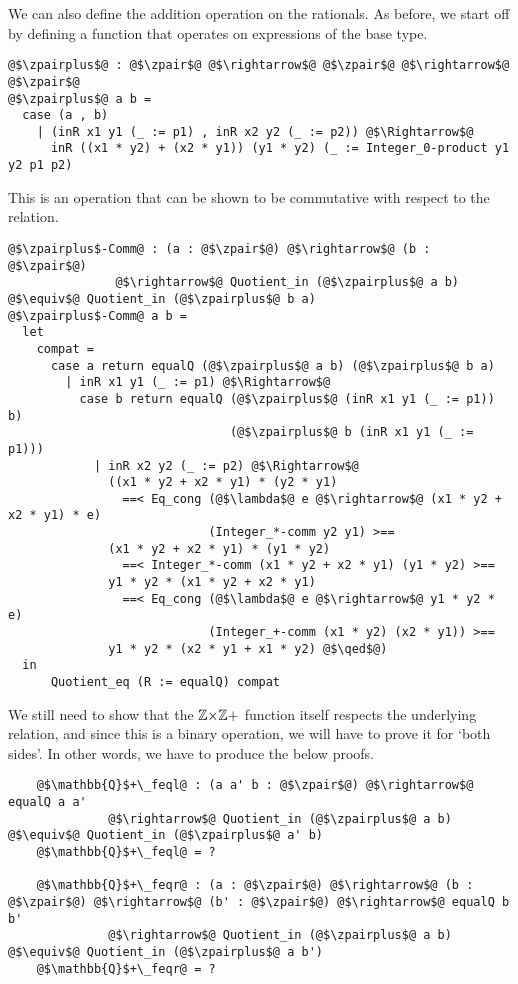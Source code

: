 \documentclass[12pt,twoside,maitrise]{dms}
\theoremstyle{definition}
\numberwithin{equation}{section}
\numberwithin{table}{chapter}
\numberwithin{figure}{chapter}
\renewcommand\qed{\blacksquare}
\begin{document}
We can also define the addition operation on the rationals. As before, we start
off by defining a function that operates on expressions of the base type.

\begin{verbatim}
@$\zpairplus$@ : @$\zpair$@ @$\rightarrow$@ @$\zpair$@ @$\rightarrow$@ @$\zpair$@
@$\zpairplus$@ a b =
  case (a , b)
    | (inR x1 y1 (_ := p1) , inR x2 y2 (_ := p2)) @$\Rightarrow$@
      inR ((x1 * y2) + (x2 * y1)) (y1 * y2) (_ := Integer_0-product y1 y2 p1 p2)
\end{verbatim}

This is an operation that can be shown to be commutative with respect to the
relation.

\begin{verbatim}
@$\zpairplus$-Comm@ : (a : @$\zpair$@) @$\rightarrow$@ (b : @$\zpair$@)
               @$\rightarrow$@ Quotient_in (@$\zpairplus$@ a b) @$\equiv$@ Quotient_in (@$\zpairplus$@ b a)
@$\zpairplus$-Comm@ a b =
  let
    compat =
      case a return equalQ (@$\zpairplus$@ a b) (@$\zpairplus$@ b a)
        | inR x1 y1 (_ := p1) @$\Rightarrow$@
          case b return equalQ (@$\zpairplus$@ (inR x1 y1 (_ := p1)) b)
                               (@$\zpairplus$@ b (inR x1 y1 (_ := p1)))
            | inR x2 y2 (_ := p2) @$\Rightarrow$@
              ((x1 * y2 + x2 * y1) * (y2 * y1)
                ==< Eq_cong (@$\lambda$@ e @$\rightarrow$@ (x1 * y2 + x2 * y1) * e)
                            (Integer_*-comm y2 y1) >==
              (x1 * y2 + x2 * y1) * (y1 * y2)
                ==< Integer_*-comm (x1 * y2 + x2 * y1) (y1 * y2) >==
              y1 * y2 * (x1 * y2 + x2 * y1)
                ==< Eq_cong (@$\lambda$@ e @$\rightarrow$@ y1 * y2 * e)
                            (Integer_+-comm (x1 * y2) (x2 * y1)) >==
              y1 * y2 * (x2 * y1 + x1 * y2) @$\qed$@)
  in
      Quotient_eq (R := equalQ) compat
\end{verbatim}

We still need to show that the $\mathbb{Z}{\times}\mathbb{Z}+$ function itself respects the
underlying relation, and since this is a binary operation, we will have to prove
it for `both sides'. In other words, we have to produce the below proofs.

\begin{verbatim}
    @$\mathbb{Q}$+\_feql@ : (a a' b : @$\zpair$@) @$\rightarrow$@ equalQ a a'
              @$\rightarrow$@ Quotient_in (@$\zpairplus$@ a b) @$\equiv$@ Quotient_in (@$\zpairplus$@ a' b)
    @$\mathbb{Q}$+\_feql@ = ?

    @$\mathbb{Q}$+\_feqr@ : (a : @$\zpair$@) @$\rightarrow$@ (b : @$\zpair$@) @$\rightarrow$@ (b' : @$\zpair$@) @$\rightarrow$@ equalQ b b'
              @$\rightarrow$@ Quotient_in (@$\zpairplus$@ a b) @$\equiv$@ Quotient_in (@$\zpairplus$@ a b')
    @$\mathbb{Q}$+\_feqr@ = ?
\end{verbatim}
\end{document}

